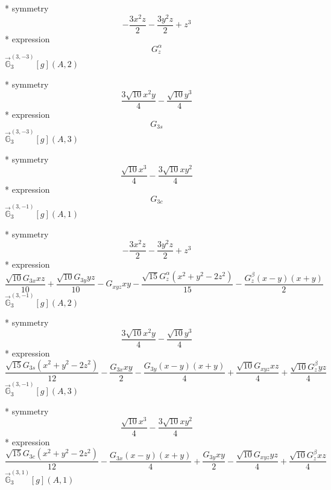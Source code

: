 \documentclass[fleqn,8pt]{jsarticle}
\begin{document}
\noindent\quad ** symmetry
\begin{dmath*}
- \frac{3 x^{2} z}{2} - \frac{3 y^{2} z}{2} + z^{3}
\end{dmath*}
\noindent\quad ** expression
\begin{dmath*}
G_{z}^{\alpha}
\end{dmath*}
\noindent\quad $\vec{\mathbb{G}}_{3}^{(3,-3)}[g](A,2)$

\noindent\quad ** symmetry
\begin{dmath*}
\frac{3 \sqrt{10} x^{2} y}{4} - \frac{\sqrt{10} y^{3}}{4}
\end{dmath*}
\noindent\quad ** expression
\begin{dmath*}
G_{3s}
\end{dmath*}
\noindent\quad $\vec{\mathbb{G}}_{3}^{(3,-3)}[g](A,3)$

\noindent\quad ** symmetry
\begin{dmath*}
\frac{\sqrt{10} x^{3}}{4} - \frac{3 \sqrt{10} x y^{2}}{4}
\end{dmath*}
\noindent\quad ** expression
\begin{dmath*}
G_{3c}
\end{dmath*}
\noindent\quad $\vec{\mathbb{G}}_{3}^{(3,-1)}[g](A,1)$

\noindent\quad ** symmetry
\begin{dmath*}
- \frac{3 x^{2} z}{2} - \frac{3 y^{2} z}{2} + z^{3}
\end{dmath*}
\noindent\quad ** expression
\begin{dmath*}
\frac{\sqrt{10} G_{3x} x z}{10} + \frac{\sqrt{10} G_{3y} y z}{10} - G_{xyz} x y - \frac{\sqrt{15} G_{z}^{\alpha} \left(x^{2} + y^{2} - 2 z^{2}\right)}{15} - \frac{G_{z}^{\beta} \left(x - y\right) \left(x + y\right)}{2}
\end{dmath*}
\noindent\quad $\vec{\mathbb{G}}_{3}^{(3,-1)}[g](A,2)$

\noindent\quad ** symmetry
\begin{dmath*}
\frac{3 \sqrt{10} x^{2} y}{4} - \frac{\sqrt{10} y^{3}}{4}
\end{dmath*}
\noindent\quad ** expression
\begin{dmath*}
\frac{\sqrt{15} G_{3s} \left(x^{2} + y^{2} - 2 z^{2}\right)}{12} - \frac{G_{3x} x y}{2} - \frac{G_{3y} \left(x - y\right) \left(x + y\right)}{4} + \frac{\sqrt{10} G_{xyz} x z}{4} + \frac{\sqrt{10} G_{z}^{\beta} y z}{4}
\end{dmath*}
\noindent\quad $\vec{\mathbb{G}}_{3}^{(3,-1)}[g](A,3)$

\noindent\quad ** symmetry
\begin{dmath*}
\frac{\sqrt{10} x^{3}}{4} - \frac{3 \sqrt{10} x y^{2}}{4}
\end{dmath*}
\noindent\quad ** expression
\begin{dmath*}
\frac{\sqrt{15} G_{3c} \left(x^{2} + y^{2} - 2 z^{2}\right)}{12} - \frac{G_{3x} \left(x - y\right) \left(x + y\right)}{4} + \frac{G_{3y} x y}{2} - \frac{\sqrt{10} G_{xyz} y z}{4} + \frac{\sqrt{10} G_{z}^{\beta} x z}{4}
\end{dmath*}
\noindent\quad $\vec{\mathbb{G}}_{3}^{(3,1)}[g](A,1)$
\end{document}
